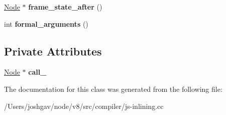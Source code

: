 \begin{DoxyCompactItemize}
\item 
\hyperlink{classv8_1_1internal_1_1compiler_1_1_node}{Node} $\ast$ {\bfseries frame\+\_\+state\+\_\+after} ()\hypertarget{classv8_1_1internal_1_1compiler_1_1_j_s_call_accessor_abf26b7b031a07928b21380f9f4cd95c1}{}\label{classv8_1_1internal_1_1compiler_1_1_j_s_call_accessor_abf26b7b031a07928b21380f9f4cd95c1}

\item 
int {\bfseries formal\+\_\+arguments} ()\hypertarget{classv8_1_1internal_1_1compiler_1_1_j_s_call_accessor_a7eec6e7653ece423110154a10ae10d32}{}\label{classv8_1_1internal_1_1compiler_1_1_j_s_call_accessor_a7eec6e7653ece423110154a10ae10d32}

\end{DoxyCompactItemize}
\subsection*{Private Attributes}
\begin{DoxyCompactItemize}
\item 
\hyperlink{classv8_1_1internal_1_1compiler_1_1_node}{Node} $\ast$ {\bfseries call\+\_\+}\hypertarget{classv8_1_1internal_1_1compiler_1_1_j_s_call_accessor_a9c6563071a3dba02752daa77cea5cc02}{}\label{classv8_1_1internal_1_1compiler_1_1_j_s_call_accessor_a9c6563071a3dba02752daa77cea5cc02}

\end{DoxyCompactItemize}


The documentation for this class was generated from the following file\+:\begin{DoxyCompactItemize}
\item 
/\+Users/joshgav/node/v8/src/compiler/js-\/inlining.\+cc\end{DoxyCompactItemize}
